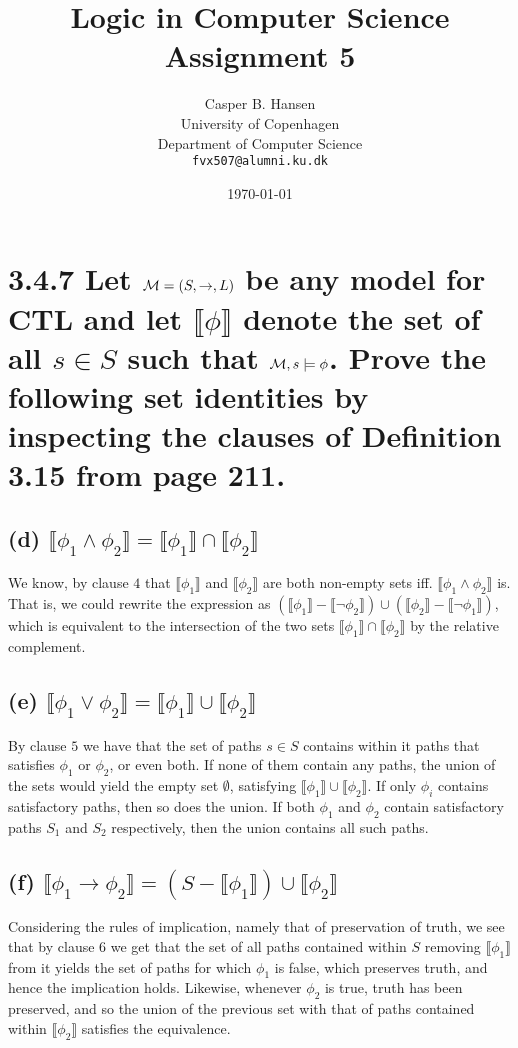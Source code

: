 \documentclass[11pt,a4paper]{article}
\title
{
{\Large Logic in Computer Science}\\
Assignment 5
}
\author
{
	Casper B. Hansen\\
	University of Copenhagen\\
	Department of Computer Science\\
	{\tt fvx507@alumni.ku.dk}
}
\date{\today}
\let\imp\to
\begin{document}
\maketitle

\section*{3.4.7 \mdseries Let ${\cal M} = (S,\imp,L)$ be any model for CTL and
let $\llbracket\phi\rrbracket$ denote the set of all $s \in S$ such that
${\cal M}, s \models \phi$. Prove the following set identities by inspecting
the clauses of Definition 3.15 from page 211.}

\subsection*{(d) \mdseries $\llbracket\phi_1 \land \phi_2\rrbracket =
\llbracket\phi_1\rrbracket\cap\llbracket\phi_2\rrbracket$}
We know, by clause $4$ that $\llbracket\phi_1\rrbracket$ and
$\llbracket\phi_2\rrbracket$ are both non-empty sets iff.
$\llbracket\phi_1 \land \phi_2\rrbracket$ is. That is, we could rewrite the
expression as $(\llbracket\phi_1\rrbracket - \llbracket\neg\phi_2\rrbracket)
\cup (\llbracket\phi_2\rrbracket - \llbracket\neg\phi_1\rrbracket)$, which is
equivalent to the intersection of the two sets
$\llbracket\phi_1\rrbracket\cap\llbracket\phi_2\rrbracket$ by the relative
complement.

\subsection*{(e) \mdseries $\llbracket\phi_1 \lor \phi_2\rrbracket =
\llbracket\phi_1\rrbracket\cup\llbracket\phi_2\rrbracket$}
By clause $5$ we have that the set of paths $s \in S$ contains within it paths
that satisfies $\phi_1$ or $\phi_2$, or even both. If none of them contain any
paths, the union of the sets would yield the empty set $\emptyset$, satisfying
$\llbracket\phi_1\rrbracket\cup\llbracket\phi_2\rrbracket$. If only $\phi_i$
contains satisfactory paths, then so does the union. If both $\phi_1$ and
$\phi_2$ contain satisfactory paths $S_1$ and $S_2$ respectively, then the
union contains all such paths.

\subsection*{(f) \mdseries $\llbracket\phi_1 \imp \phi_2\rrbracket =
(S - \llbracket\phi_1\rrbracket)\cup\llbracket\phi_2\rrbracket$}
Considering the rules of implication, namely that of preservation of truth, we
see that by clause $6$ we get that the set of all paths contained within $S$
removing $\llbracket\phi_1\rrbracket$ from it yields the set of paths for
which $\phi_1$ is false, which preserves truth, and hence the implication
holds. Likewise, whenever $\phi_2$ is true, truth has been preserved, and so
the union of the previous set with that of paths contained within
$\llbracket\phi_2\rrbracket$ satisfies the equivalence.
\end{document}
